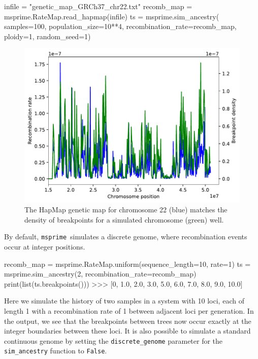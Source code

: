 \documentclass[graybox]{svmult}
\newcommand{\msprime}[0]{\texttt{msprime}}
\begin{document}
\begin{pythoncode}
infile = "genetic_map_GRCh37_chr22.txt"
recomb_map = msprime.RateMap.read_hapmap(infile)
ts = msprime.sim_ancestry(
    samples=100, population_size=10**4,
    recombination_rate=recomb_map, ploidy=1, random_seed=1)
\end{pythoncode}

\begin{figure}
\begin{center}
\includegraphics[width=\textwidth]{images/plot_11.pdf}
\end{center}
\caption{\label{fig:variable_recombination} The HapMap
genetic map for chromosome 22 (blue) matches the density of breakpoints for a simulated chromosome (green) well.}
\end{figure}

By default, \msprime\ simulates a discrete genome, where recombination
events occur at integer positions.

\begin{pythoncode}
recomb_map = msprime.RateMap.uniform(sequence_length=10, rate=1)
ts = msprime.sim_ancestry(2, recombination_rate=recomb_map)
print(list(ts.breakpoints()))
>>> [0, 1.0, 2.0, 3.0, 5.0, 6.0, 7.0, 8.0, 9.0, 10.0]
\end{pythoncode}

    Here we simulate the history of two samples in a system with 10 loci, each of
length 1 with a recombination rate of 1 between adjacent loci per
generation. In the output, we see that the breakpoints between trees now
occur exactly at the integer boundaries between these loci. It is also possible to simulate
a standard continuous genome by setting the \texttt{discrete\_genome} parameter for the \texttt{sim\_ancestry} function
to \texttt{False}.
\end{document}

